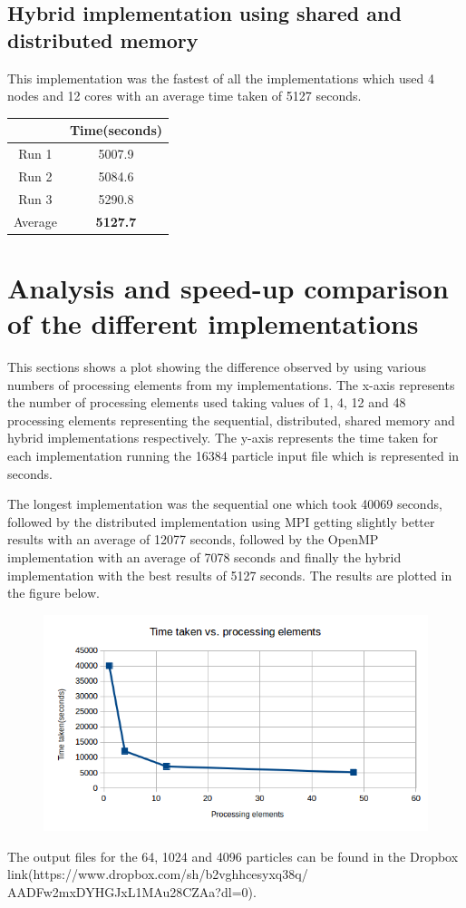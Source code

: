 \documentclass[12pt]{IEEEtran}
\begin{document}
\subsection{Hybrid implementation using shared and distributed memory}
This implementation was the fastest of all the implementations which used 4 nodes and 12 cores with an average time taken of 5127 seconds.
\begin{table}[H]
\centering
\captionsetup{justification=centering}
\renewcommand{\arraystretch}{1.3}
\begin{tabular}{|c|c|}
\hline
   & Time(seconds)\\
\hline
  Run 1 & 5007.9 \\
\hline
  Run 2 & 5084.6\\
\hline
  Run 3 &  5290.8\\
\hline
  Average & \textbf{5127.7}\\
\hline
\end{tabular}
\end{table}	

\section{Analysis and speed-up comparison of the different implementations}
This sections shows a plot showing the difference observed by using various numbers of processing elements from my implementations. The x-axis represents the number of processing elements used taking values of 1, 4, 12 and 48 processing elements representing the sequential, distributed, shared memory and hybrid implementations respectively. The y-axis represents the time taken for each implementation running the 16384 particle input file which is represented in seconds.
\medskip

The longest implementation was the sequential one which took 40069 seconds, followed by the distributed implementation using MPI getting slightly better results with an average of 12077 seconds, followed by the OpenMP implementation with an average of 7078 seconds and finally the hybrid implementation with the best results of 5127 seconds. The results are plotted in the figure below. 

\begin{figure}[H]
	\centering
	\begin{center}
	\centering
		\includegraphics{speedups2}	
	\end{center}
\end{figure}

The output files for the 64, 1024 and 4096 particles can be found in the Dropbox link(https://www.dropbox.com/sh/b2vghhcesyxq38q/
AADFw2mxDYHGJxL1MAu28CZAa?dl=0).
\end{document}
